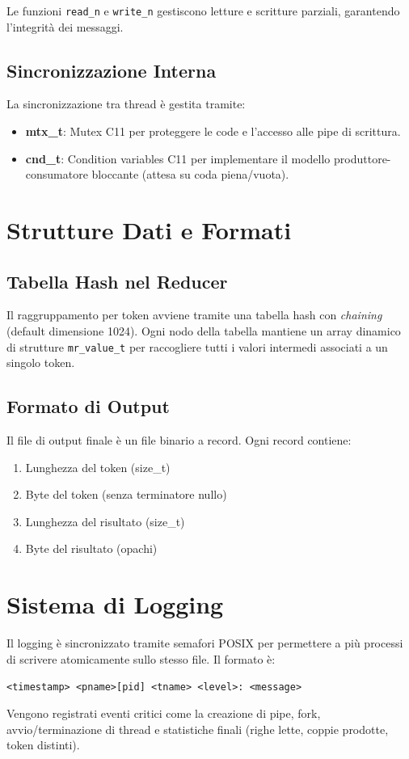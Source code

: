 \documentclass[12pt,a4paper]{article}
\begin{document}
Le funzioni \texttt{read\_n} e \texttt{write\_n} gestiscono letture e scritture parziali, garantendo l'integrità dei messaggi.

\subsection{Sincronizzazione Interna}
La sincronizzazione tra thread è gestita tramite:
\begin{itemize}
    \item \textbf{mtx\_t}: Mutex C11 per proteggere le code e l'accesso alle pipe di scrittura.
    \item \textbf{cnd\_t}: Condition variables C11 per implementare il modello produttore-consumatore bloccante (attesa su coda piena/vuota).
\end{itemize}

\section{Strutture Dati e Formati}
\subsection{Tabella Hash nel Reducer}
Il raggruppamento per token avviene tramite una tabella hash con \textit{chaining} (default dimensione 1024). Ogni nodo della tabella mantiene un array dinamico di strutture \texttt{mr\_value\_t} per raccogliere tutti i valori intermedi associati a un singolo token.

\subsection{Formato di Output}
Il file di output finale è un file binario a record. Ogni record contiene:
\begin{enumerate}
    \item Lunghezza del token (size\_t)
    \item Byte del token (senza terminatore nullo)
    \item Lunghezza del risultato (size\_t)
    \item Byte del risultato (opachi)
\end{enumerate}

\section{Sistema di Logging}
Il logging è sincronizzato tramite semafori POSIX per permettere a più processi di scrivere atomicamente sullo stesso file. Il formato è:
\begin{center}
    \texttt{<timestamp> <pname>[pid] <tname> <level>: <message>}
\end{center}
Vengono registrati eventi critici come la creazione di pipe, fork, avvio/terminazione di thread e statistiche finali (righe lette, coppie prodotte, token distinti).
\end{document}
